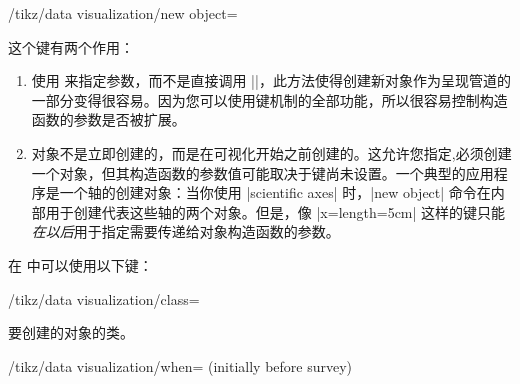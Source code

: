 \begin{key}{/tikz/data visualization/new object=} %

    这个键有两个作用：
    \begin{enumerate}
        \item 使用  来指定参数，而不是直接调用 |\pgfoonew|，此方法使得创建新对象作为呈现管道的一部分变得很容易。因为您可以使用键机制的全部功能，所以很容易控制构造函数的参数是否被扩展。
        \item 对象不是立即创建的，而是在可视化开始之前创建的。这允许您指定,必须创建一个对象，但其构造函数的参数值可能取决于键尚未设置。一个典型的应用程序是一个轴的创建对象：当你使用 |scientific axes| 时，|new object| 命令在内部用于创建代表这些轴的两个对象。但是，像 |x={length=5cm}| 这样的键只能\emph{在以后}用于指定需要传递给对象构造函数的参数。
  \end{enumerate}


    在  中可以使用以下键：
    \begin{key}{/tikz/data visualization/class=} %

        要创建的对象的类。
    \end{key}
    \begin{key}{/tikz/data visualization/when= (initially before survey)} %


\end{key}
\end{key}
